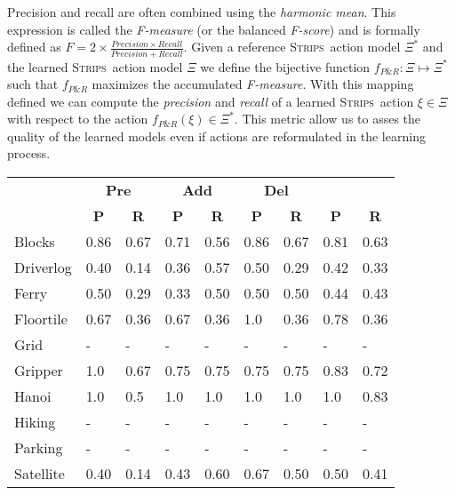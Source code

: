 \documentclass{article}
\newcommand{\strips}{\textsc{Strips}}     %
\begin{document}
Precision and recall are often combined using the {\em harmonic mean}. This expression is called the {\em F-measure} (or the balanced {\em F-score}) and is formally defined as $F=2\times\frac{Precision\times Recall}{Precision+Recall}$. Given a reference \strips\ action model $\Xi^*$ and the learned \strips\ action model $\Xi$ we define the bijective function $f_{P\&R}:\Xi \mapsto \Xi^*$ such that $f_{P\&R}$ maximizes the accumulated {\em F-measure}. With this mapping defined we can compute the {\em precision} and {\em recall} of a learned \strips\ action $\xi\in\Xi$ with respect to the action $f_{P\&R}(\xi)\in \Xi^*$. This metric allow us to asses the quality of the learned models even if actions are reformulated in the learning process.


\begin{table}
		\begin{center}
\begin{scriptsize}                
				\begin{tabular}{l|l|l|l|l|l|l||l|l|}
					& \multicolumn{2}{|c|}{\bf Pre} & \multicolumn{2}{|c|}{\bf Add} & \multicolumn{2}{|c||}{\bf Del} & \multicolumn{2}{|c}{\bf}\\ \cline{2-9}			
					& \multicolumn{1}{|c|}{\bf P} & \multicolumn{1}{|c|}{\bf R} & \multicolumn{1}{|c|}{\bf P} & \multicolumn{1}{|c|}{\bf R} & \multicolumn{1}{|c|}{\bf P} & \multicolumn{1}{|c||}{\bf R} &  \multicolumn{1}{|c|}{\bf P} & \multicolumn{1}{|c|}{\bf R} \\
					\hline
					Blocks & 0.86 & 0.67 & 0.71 & 0.56 & 0.86 & 0.67 & 0.81 & 0.63 \\
					Driverlog & 0.40 & 0.14 & 0.36 & 0.57 & 0.50 & 0.29 & 0.42 & 0.33 \\
					Ferry & 0.50 & 0.29 & 0.33 & 0.50 & 0.50 & 0.50 & 0.44 & 0.43 \\
					Floortile & 0.67 & 0.36 & 0.67 & 0.36 & 1.0 & 0.36 & 0.78 & 0.36 \\
					Grid & - & - & - & - & - & - & - & - \\ %
					Gripper & 1.0 & 0.67 & 0.75 & 0.75 & 0.75 & 0.75 & 0.83 & 0.72 \\
					Hanoi & 1.0 & 0.5 & 1.0 & 1.0 & 1.0 & 1.0 & 1.0 & 0.83 \\
					Hiking & - & - & - & - & - & - & - & - \\ %
					Parking & - & - & - & - & - & - & - & - \\ %
					Satellite & 0.40 & 0.14 & 0.43 & 0.60 & 0.67 & 0.50 & 0.50 & 0.41 \\

\end{tabular}
\end{scriptsize}
\end{center}
\end{table}
\end{document}
